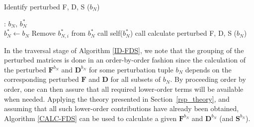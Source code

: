 \documentclass[%
 reprint,
 amsmath,amssymb,
 aps,
]{revtex4-1}
\begin{document}
\begin{algorithm}
\caption{Identify perturbed F, D, S ($b_{N}$)}
\label{ID-FDS}
\begin{algorithmic}
   : $b_{N}$, $b_{N}^{*}$\\

            \State $b_{N}^{*} \gets b_{N}$
            \State Remove $b_{N, i}^{*}$  from $b_{N}^{*}$
            \State call self($b_{N}^{*}$)
          \EndIf
      \EndFor
   \EndIf
        \State call calculate perturbed F, D, S ($b_{N}$)
      \EndIf
   \EndIf
\end{algorithmic}
\end{algorithm}

In the traversal stage of Algorithm \ref{ID-FDS}, we note that the grouping of the perturbed matrices is done in an order-by-order fashion since the calculation of the perturbed $\mathbf{F}^{b_{N}}$ and $\mathbf{D}^{b_{N}}$ for some perturbation tuple $b_{N}$ depends on the corresponding perturbed $\mathbf{F}$ and $\mathbf{D}$ for all subsets of $b_{N}$. By proceeding order by order, one can then assure that all required lower-order terms will be available when needed. Applying the theory presented in Section~\ref{rsp_theory}, and assuming that all such lower-order contributions have already been obtained, Algorithm \ref{CALC-FDS} can be used to calculate a given $\mathbf{F}^{b_{N}}$ and $\mathbf{D}^{b_{N}}$ (and $\mathbf{S}^{b_{N}}$).

\end{document}
